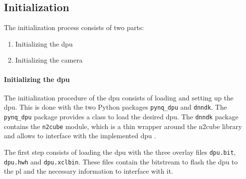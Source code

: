 \subsection{Initialization}
\label{subsec:inference:app:initialization}

The initialization process consists of two parts:
\begin{enumerate}
  \item Initializing the \acrshort{dpu}
  \item Initializing the camera
\end{enumerate}

\paragraph{Initializing the \acrshort{dpu}}
The initialization procedure of the \acrshort{dpu} consists of loading and setting up the \acrshort{dpu}.
This is done with the two Python packages \texttt{pynq\_dpu} and \texttt{dnndk}.
The \texttt{pynq\_dpu} package provides a class to load the desired \acrshort{dpu}.
The \texttt{dnndk} package contains the \texttt{n2cube} module, which is a thin wrapper around the \acrshort{n2cube} library and allows to interface with the implemented \acrshort{dpu} \cite{inf_github_dpu_pynq}.

The first step consists of loading the \acrshort{dpu} with the three overlay files \texttt{dpu.bit}, \texttt{dpu.hwh} and \texttt{dpu.xclbin}.
These files contain the bitstream to flash the \acrshort{dpu} to the \acrlong{pl} and the necessary information to interface with it.

